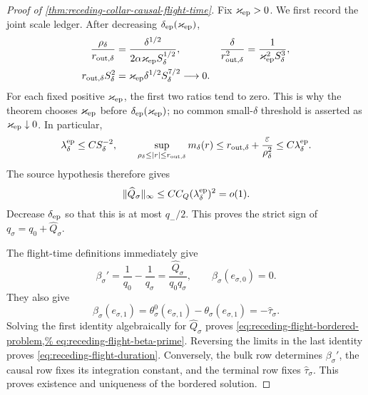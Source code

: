 \begin{proof}[Proof of
\cref{thm:receding-collar-causal-flight-time}]
Fix \(\varkappa_{\rm ep}>0\).  We first record the joint scale ledger.
After decreasing \(\delta_{\rm ep}(\varkappa_{\rm ep})\),
\begin{align}
 \frac{\rho_\delta}{r_{{\rm out},\delta}}
 &=\frac{\delta^{1/2}}
        {2\alpha\varkappa_{\rm ep}S_\delta^{1/2}},
 &
 \frac{\delta}{r_{{\rm out},\delta}^2}
 &=\frac1{\varkappa_{\rm ep}^2S_\delta^3},        \label{eq:proof-receding-flight-geometric-ratios}\\
 r_{{\rm out},\delta}S_\delta^2
 &=\varkappa_{\rm ep}\delta^{1/2}S_\delta^{7/2}
 \longrightarrow0.                              \label{eq:proof-receding-flight-lambda-ratio}
\end{align}
For each fixed positive \(\varkappa_{\rm ep}\), the first two ratios tend
to zero.  This is why the theorem chooses
\(\varkappa_{\rm ep}\) before
\(\delta_{\rm ep}(\varkappa_{\rm ep})\); no common small-\(\delta\)
threshold is asserted as \(\varkappa_{\rm ep}\downarrow0\).
In particular,
\begin{equation}
 \lambda_\delta^{\rm ep}\le CS_\delta^{-2},\qquad
 \sup_{\rho_\delta\le |r|\le r_{{\rm out},\delta}}
        m_\delta(r)
 \le r_{{\rm out},\delta}
       +\frac{\varepsilon}{\rho_\delta^2}
 \le C\lambda_\delta^{\rm ep}.                   \label{eq:proof-receding-flight-source-maximum}
\end{equation}
The source hypothesis therefore gives
\[
 \|\widehat Q_\sigma\|_\infty
 \le CC_Q(\lambda_\delta^{\rm ep})^2=o(1).
\]
Decrease \(\delta_{\rm ep}\) so that this is at most \(q_-/2\).
This proves the strict sign of \(q_\sigma=q_0+\widehat Q_\sigma\).

The flight-time definitions immediately give
\[
 \beta_\sigma'
 =\frac1{q_0}-\frac1{q_\sigma}
 =\frac{\widehat Q_\sigma}{q_0q_\sigma},
 \qquad
 \beta_\sigma(e_{\sigma,0})=0.
\]
They also give
\[
 \beta_\sigma(e_{\sigma,1})
 =\theta_\sigma^0(e_{\sigma,1})
       -\theta_\sigma(e_{\sigma,1})
 =-\widehat\tau_\sigma.
\]
Solving the first identity algebraically for
\(\widehat Q_\sigma\) proves
\cref{eq:receding-flight-bordered-problem,%
eq:receding-flight-beta-prime}.  Reversing the limits in the last
identity proves \cref{eq:receding-flight-duration}.  Conversely, the bulk
row determines \(\beta_\sigma'\), the causal row fixes its integration
constant, and the terminal row fixes \(\widehat\tau_\sigma\).  This proves
existence and uniqueness of the bordered solution.


\end{proof}
